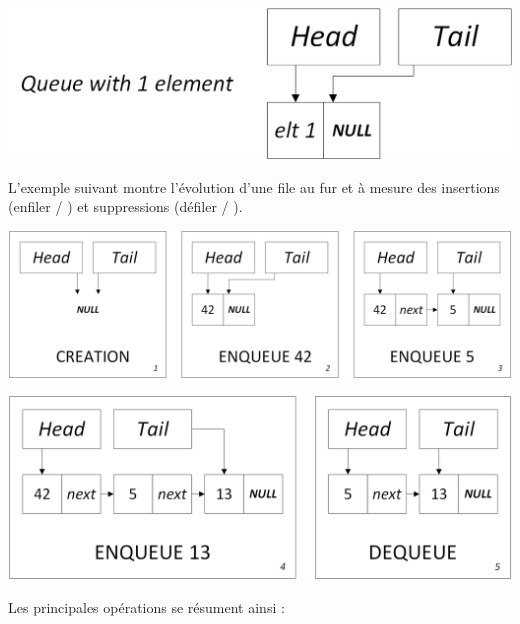 \documentclass[11pt,a4paper]{article}
\begin{document}
\smallskip

\begin{center}
\includegraphics[scale=0.75]{img/files/Files_3_Liste_Chainee_Structure_cas_1_elt_etiquette.png}
\end{center}

\smallskip

L'exemple suivant montre l'évolution d'une file au fur et à mesure des insertions (enfiler / ) et suppressions (défiler / ).\\

\begin{center}
\includegraphics[scale=0.60]{img/files/Files_4_Liste_Chainee_Usage_pack_1.png}
\end{center}

\begin{center}
\includegraphics[scale=0.60]{img/files/Files_4_Liste_Chainee_Usage_pack_2.png}
\end{center}

\smallskip

Les principales opérations se résument ainsi :
\end{document}
